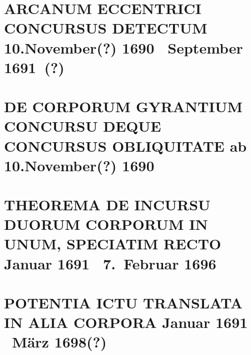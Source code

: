 \documentclass[%
fontsize=10pt,
]{scrbook}
\DeclareRobustCommand{\bracks}[1]{%
\textup{\lbrack}#1\textup{\rbrack}}
\begin{document}
\chapter[tocentry={Arcanum eccentrici concursus detectum
\enskip\bracks{10.\;November\;(?) 1690 \textendash\ September 1691~(?)}},
head={Arcanum eccentrici concursus detectum}]%
{\MakeUppercase{Arcanum eccentrici concursus detectum}
\newline\bracks{10.\;November\;(?) 1690 \textendash\ September 1691~(?)}}
\label{60339}




\chapter[tocentry={De corporum gyrantium concursu deque concursus obliquitate
\enskip\bracks{%
ab 10.\;November\;(?) 1690%
}},
head={De corporum gyrantium concursu deque concursus obliquitate}]%
{\MakeUppercase{De corporum gyrantium concursu deque concursus obliquitate}
\newline\bracks{%
ab 10.\;November\;(?) 1690%
}}%
\label{58950}







\chapter[tocentry={Theorema de incursu duorum corporum in unum, speciatim recto
\enskip \bracks{Januar 1691 \textendash\ 7.~Februar 1696}},
head={Theorema de incursu duorum corporum in unum, speciatim recto}]%
{\MakeUppercase{Theorema de incursu duorum corporum in unum, speciatim recto}
\newline \bracks{Januar 1691 \textendash\ 7.~Februar 1696}}
\label{58300}




\chapter[tocentry={Potentia ictu translata in alia corpora
\enskip\bracks{%
Januar 1691 \textendash\ März 1698\;(?)%
}},
head={Potentia ictu translata in alia corpora}]%
{\MakeUppercase{Potentia ictu translata in alia corpora}
\newline\bracks{%
Januar 1691 \textendash\ März 1698\;(?)%
}}
\label{60359}

\end{document}
